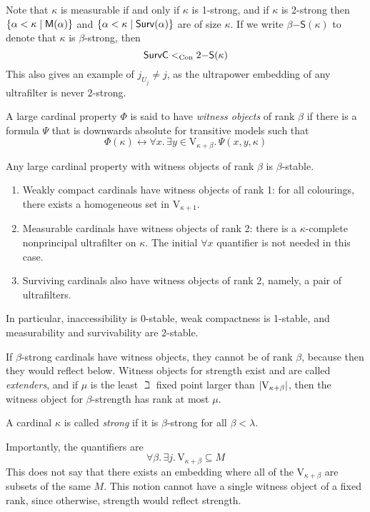 Note that \( \kappa \) is measurable if and only if \( \kappa \) is 1-strong, and if \( \kappa \) is 2-strong then \( \qty{\alpha < \kappa \mid \mathsf{M}(\alpha)} \) and \( \qty{\alpha < \kappa \mid \mathsf{Surv}(\alpha)} \) are of size \( \kappa \).
If we write \( \beta\mathsf{-S}(\kappa) \) to denote that \( \kappa \) is \( \beta \)-strong, then
\[ \mathsf{SurvC} <_{\operatorname{Con}} 2\mathsf{-S}(\kappa) \]
This also gives an example of \( j_{U_j} \neq j \), as the ultrapower embedding of any ultrafilter is never 2-strong.
\begin{definition}
    A large cardinal property \( \Phi \) is said to have \emph{witness objects} of rank \( \beta \) if there is a formula \( \Psi \) that is downwards absolute for transitive models such that
    \[ \Phi(\kappa) \leftrightarrow \forall x.\, \exists y \in \mathrm{V}_{\kappa + \beta}.\, \Psi(x, y, \kappa) \]
\end{definition}
Any large cardinal property with witness objects of rank \( \beta \) is \( \beta \)-stable.
\begin{example}
    \begin{enumerate}
        \item Weakly compact cardinals have witness objects of rank 1: for all colourings, there exists a homogeneous set in \( \mathrm{V}_{\kappa + 1} \).
        \item Measurable cardinals have witness objects of rank 2: there is a \( \kappa \)-complete nonprincipal ultrafilter on \( \kappa \).
        The initial \( \forall x \) quantifier is not needed in this case.
        \item Surviving cardinals also have witness objects of rank 2, namely, a pair of ultrafilters.
    \end{enumerate}
\end{example}
In particular, inaccessibility is 0-stable, weak compactness is 1-stable, and measurability and survivability are 2-stable.
\begin{remark}
    If \( \beta \)-strong cardinals have witness objects, they cannot be of rank \( \beta \), because then they would reflect below.
    Witness objects for strength exist and are called \emph{extenders}, and if \( \mu \) is the least \( \beth \) fixed point larger than \( \abs{\mathrm{V}_{\kappa + \beta}} \), then the witness object for \( \beta \)-strength has rank at most \( \mu \).
\end{remark}
\begin{definition}
    A cardinal \( \kappa \) is called \emph{strong} if it is \( \beta \)-strong for all \( \beta < \lambda \).
\end{definition}
Importantly, the quantifiers are
\[ \forall \beta.\, \exists j.\, \mathrm{V}_{\kappa + \beta} \subseteq M \]
This does not say that there exists an embedding where all of the \( \mathrm{V}_{\kappa + \beta} \) are subsets of the same \( M \).
This notion cannot have a single witness object of a fixed rank, since otherwise, strength would reflect strength.

